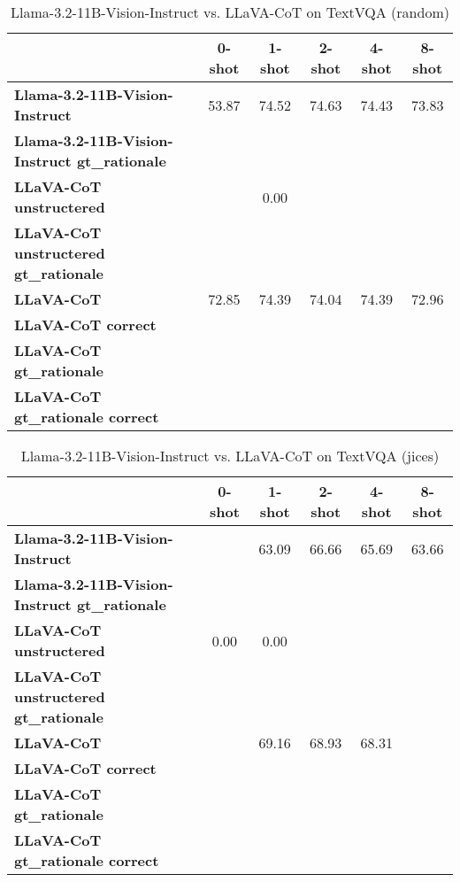 \begin{table}
\caption{Llama-3.2-11B-Vision-Instruct vs. LLaVA-CoT on TextVQA (random)}
\label{tab:Llama-3.2-11B-Vision-Instruct_TextVQA_TRAIN_random}
\begin{tabular}{lccccc}
\toprule
 & 0-shot & 1-shot & 2-shot & 4-shot & 8-shot \\
\midrule
\textbf{Llama-3.2-11B-Vision-Instruct} & 53.87 & 74.52 & 74.63 & 74.43 & 73.83 \\
\textbf{Llama-3.2-11B-Vision-Instruct gt\_rationale} &  &  &  &  &  \\
\textbf{LLaVA-CoT unstructered} &  & 0.00 &  &  &  \\
\textbf{LLaVA-CoT unstructered gt\_rationale} &  &  &  &  &  \\
\textbf{LLaVA-CoT} & 72.85 & 74.39 & 74.04 & 74.39 & 72.96 \\
\textbf{LLaVA-CoT correct} &  &  &  &  &  \\
\textbf{LLaVA-CoT gt\_rationale} &  &  &  &  &  \\
\textbf{LLaVA-CoT gt\_rationale correct} &  &  &  &  &  \\
\bottomrule
\end{tabular}
\end{table}


\begin{table}
\caption{Llama-3.2-11B-Vision-Instruct vs. LLaVA-CoT on TextVQA (jices)}
\label{tab:Llama-3.2-11B-Vision-Instruct_TextVQA_TRAIN_jices}
\begin{tabular}{lccccc}
\toprule
 & 0-shot & 1-shot & 2-shot & 4-shot & 8-shot \\
\midrule
\textbf{Llama-3.2-11B-Vision-Instruct} &  & 63.09 & 66.66 & 65.69 & 63.66 \\
\textbf{Llama-3.2-11B-Vision-Instruct gt\_rationale} &  &  &  &  &  \\
\textbf{LLaVA-CoT unstructered} & 0.00 & 0.00 &  &  &  \\
\textbf{LLaVA-CoT unstructered gt\_rationale} &  &  &  &  &  \\
\textbf{LLaVA-CoT} &  & 69.16 & 68.93 & 68.31 &  \\
\textbf{LLaVA-CoT correct} &  &  &  &  &  \\
\textbf{LLaVA-CoT gt\_rationale} &  &  &  &  &  \\
\textbf{LLaVA-CoT gt\_rationale correct} &  &  &  &  &  \\
\bottomrule
\end{tabular}
\end{table}


